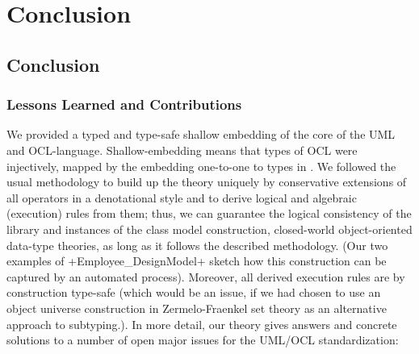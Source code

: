\part{Conclusion}

\chapter{Conclusion}

\section{Lessons Learned and Contributions}
We provided a typed and type-safe shallow embedding 
of the core of the UML and OCL-language. Shallow-embedding means
that types of OCL were injectively,\ie{} mapped by the embedding
one-to-one to types in \HOL. We followed the usual methodology to
build up the theory uniquely by conservative extensions
of all operators in a denotational style 
and to derive logical and algebraic (execution) rules
from them; thus, we can guarantee the logical consistency 
of the library and instances of the class model construction,
  \ie{} closed-world object-oriented data-type theories,
  as long as it follows the described methodology.
(Our two examples of \inlineisar+Employee_DesignModel+ sketch
  how this construction can be captured by an automated process).
Moreover, all derived execution rules are by construction
type-safe (which would be an issue, if we had chosen
  to use an object universe construction in Zermelo-Fraenkel
  set theory as an alternative approach to subtyping.).
In more detail, our theory gives answers and concrete
solutions to a number of open major issues for the UML/OCL standardization:
